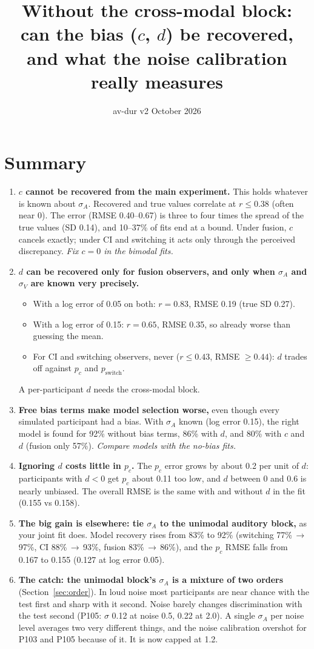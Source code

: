 \documentclass[11pt,a4paper]{article}
\title{Without the cross-modal block: can the bias ($c$, $d$) be recovered,\\ and what the noise calibration really measures}
\author{av-dur v2 \quad 29 October 2026}
\date{}
\newcommand{\pc}{p_c}
\begin{document}
\maketitle
\vspace{-1.5em}

\section*{Summary}
\begin{enumerate}
\item \textbf{$c$ cannot be recovered from the main experiment.} This holds whatever is known about $\sigma_A$. Recovered and true values correlate at $r \le 0.38$ (often near 0). The error (RMSE 0.40--0.67) is three to four times the spread of the true values (SD 0.14), and 10--37\% of fits end at a bound. Under fusion, $c$ cancels exactly; under CI and switching it acts only through the perceived discrepancy. \emph{Fix $c = 0$ in the bimodal fits.}
\item \textbf{$d$ can be recovered only for fusion observers, and only when $\sigma_A$ and $\sigma_V$ are known very precisely.}
  \begin{itemize}
  \item With a log error of 0.05 on both: $r = 0.83$, RMSE 0.19 (true SD 0.27).
  \item With a log error of 0.15: $r = 0.65$, RMSE 0.35, so already worse than guessing the mean.
  \item For CI and switching observers, never ($r \le 0.43$, RMSE $\ge 0.44$): $d$ trades off against $\pc$ and $p_\text{switch}$.
  \end{itemize}
  A per-participant $d$ needs the cross-modal block.
\item \textbf{Free bias terms make model selection worse,} even though every simulated participant had a bias. With $\sigma_A$ known (log error 0.15), the right model is found for 92\% without bias terms, 86\% with $d$, and 80\% with $c$ and $d$ (fusion only 57\%). \emph{Compare models with the no-bias fits.}
\item \textbf{Ignoring $d$ costs little in $\pc$.} The $\pc$ error grows by about 0.2 per unit of $d$: participants with $d < 0$ get $\pc$ about 0.11 too low, and $d$ between 0 and 0.6 is nearly unbiased. The overall RMSE is the same with and without $d$ in the fit (0.155 vs 0.158).
\item \textbf{The big gain is elsewhere: tie $\sigma_A$ to the unimodal auditory block,} as your joint fit does. Model recovery rises from 83\% to 92\% (switching 77\%\,$\to$\,97\%, CI 88\%\,$\to$\,93\%, fusion 83\%\,$\to$\,86\%), and the $\pc$ RMSE falls from 0.167 to 0.155 (0.127 at log error 0.05).
\item \textbf{The catch: the unimodal block's $\sigma_A$ is a mixture of two orders} (Section~\ref{sec:order}). In loud noise most participants are near chance with the test first and sharp with it second. Noise barely changes discrimination with the test second (P105: $\sigma$ 0.12 at noise 0.5, 0.22 at 2.0). A single $\sigma_A$ per noise level averages two very different things, and the noise calibration overshot for P103 and P105 because of it. It is now capped at 1.2.
\end{enumerate}
\end{document}
